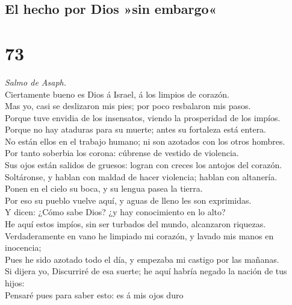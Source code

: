 \hypertarget{el-hecho-por-dios-sin-embargo}{%
\subsection{El hecho por Dios »sin
embargo«}\label{el-hecho-por-dios-sin-embargo}}

\hypertarget{section-72}{%
\section{73}\label{section-72}}

 \emph{Salmo de Asaph.}\\
Ciertamente bueno es Dios á Israel, á los limpios de corazón.\\
 Mas yo, casi se deslizaron mis pies; por poco resbalaron
mis pasos.\\
 Porque tuve envidia de los insensatos, viendo la
prosperidad de los impíos.\\
 Porque no hay ataduras para su muerte; antes su fortaleza
está entera.\\
 No están ellos en el trabajo humano; ni son azotados con
los otros hombres.\\
 Por tanto soberbia los corona: cúbrense de vestido de
violencia.\\
 Sus ojos están salidos de gruesos: logran con creces los
antojos del corazón.\\
 Soltáronse, y hablan con maldad de hacer violencia; hablan
con altanería.\\
 Ponen en el cielo su boca, y su lengua pasea la tierra.\\
 Por eso su pueblo vuelve aquí, y aguas de lleno les son
exprimidas.\\
 Y dicen: ¿Cómo sabe Dios? ¿y hay conocimiento en lo
alto?\\
 He aquí estos impíos, sin ser turbados del mundo,
alcanzaron riquezas.\\
 Verdaderamente en vano he limpiado mi corazón, y lavado
mis manos en inocencia;\\
 Pues he sido azotado todo el día, y empezaba mi castigo
por las mañanas.\\
 Si dijera yo, Discurriré de esa suerte; he aquí habría
negado la nación de tus hijos:\\
 Pensaré pues para saber esto: es á mis ojos duro
